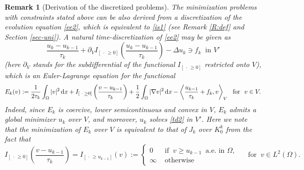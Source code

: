\documentclass[reqno,10pt]{amsart}
\newtheorem{Rem}[Th]{Remark}
\begin{document}
\begin{Rem}[Derivation of the discretized problems]
{\rm
 The minimization problems with constraints stated above can be
 also derived from a discretization of the evolution equation \eqref{ee2},
 which is equivalent to \eqref{is1} (see Remark \ref{R:def} and
 Section \ref{sec-uni}). 
A natural time-discretization of \eqref{ee2} may be given as
\begin{equation}\label{td2}
\dfrac{u_k-u_{k-1}}{\tau_k} + \partial_V {I_{[~\cdot\, \geq 0]}} \left(
 \dfrac{u_k-u_{k-1}}{\tau_k} \right) - \Delta u_k \ni f_k
\ \mbox{ in } V'
\end{equation}
(here $\partial_V$ stands for the subdifferential of the functional ${I_{[~\cdot\, \geq 0]}}$
 restricted onto $V$),
which is an Euler-Lagrange equation for the functional
$$
E_k(v) := \dfrac{1}{2\tau_k} \int_\Omega |v|^2 \, {\text{\rm d}} x
+ {I_{[~\cdot\, \geq 0]}} \left( \dfrac{v - u_{k-1}}{\tau_k} \right)
+ \dfrac 1 2 \int_\Omega |\nabla v|^2 \, {\text{\rm d}} x 
- \left\langle \dfrac{u_{k-1}}{\tau_k} + f_k, v
 \right\rangle_V \ \mbox{ for } \ v \in V.
$$
Indeed, since $E_k$ is coercive, lower semicontinuous and convex in $V$,
 $E_k$ admits a global minimizer $u_k$ over $V$, and moreover, $u_k$ solves
 \eqref{td2} in $V'$. Here we note that the minimization of $E_k$ over
 $V$ is equivalent to that of $J_k$ over $K_0^k$ from the fact that
$$
{I_{[~\cdot\, \geq 0]}} \left( \dfrac{v-u_{k-1}}{\tau_k} \right) 
= I_{[\,\cdot\, \geq u_{k-1}]}(v)
:= \begin{cases}
    0 &\mbox{ if } \ v \geq u_{k-1} \ \mbox{ a.e.~in } \Omega,\\
    \infty &\mbox{ otherwise}
   \end{cases}
 \quad \mbox{ for } \ v \in L^2(\Omega).
$$
}
\end{Rem}
\end{document}

